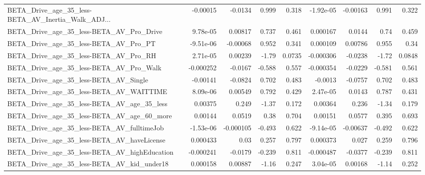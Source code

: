 \begin{tabular}{lrrrrrrrr}
BETA\_Drive\_age\_35\_less-BETA\_AV\_Inertia\_Walk\_ADJ... &    -0.00015 &      -0.0134 &    0.999 &    0.318 &  -1.92e-05 &    -0.00163 &        0.991 &         0.322 \\
BETA\_Drive\_age\_35\_less-BETA\_AV\_Pro\_Drive           &    9.78e-05 &      0.00817 &    0.737 &    0.461 &   0.000167 &      0.0144 &         0.74 &         0.459 \\
BETA\_Drive\_age\_35\_less-BETA\_AV\_Pro\_PT              &   -9.51e-06 &     -0.00068 &    0.952 &    0.341 &   0.000109 &     0.00786 &        0.955 &          0.34 \\
BETA\_Drive\_age\_35\_less-BETA\_AV\_Pro\_RH              &    2.71e-05 &      0.00239 &    -1.79 &   0.0735 &  -0.000306 &     -0.0238 &        -1.72 &        0.0848 \\
BETA\_Drive\_age\_35\_less-BETA\_AV\_Pro\_Walk            &   -0.000252 &      -0.0167 &   -0.588 &    0.557 &  -0.000354 &     -0.0229 &       -0.581 &         0.561 \\
BETA\_Drive\_age\_35\_less-BETA\_AV\_Single              &    -0.00141 &      -0.0824 &    0.702 &    0.483 &    -0.0013 &     -0.0757 &        0.702 &         0.483 \\
BETA\_Drive\_age\_35\_less-BETA\_AV\_WAITTIME            &    8.09e-06 &      0.00549 &    0.792 &    0.429 &   2.47e-05 &      0.0143 &        0.787 &         0.431 \\
BETA\_Drive\_age\_35\_less-BETA\_AV\_age\_35\_less         &     0.00375 &        0.249 &    -1.37 &    0.172 &    0.00364 &       0.236 &        -1.34 &         0.179 \\
BETA\_Drive\_age\_35\_less-BETA\_AV\_age\_60\_more         &     0.00144 &       0.0519 &     0.38 &    0.704 &    0.00151 &      0.0577 &        0.395 &         0.693 \\
BETA\_Drive\_age\_35\_less-BETA\_AV\_fulltimeJob         &   -1.53e-06 &    -0.000105 &   -0.493 &    0.622 &  -9.14e-05 &    -0.00637 &       -0.492 &         0.622 \\
BETA\_Drive\_age\_35\_less-BETA\_AV\_haveLicense         &    0.000433 &         0.03 &    0.257 &    0.797 &   0.000373 &       0.027 &        0.259 &         0.796 \\
BETA\_Drive\_age\_35\_less-BETA\_AV\_highEducation       &   -0.000241 &      -0.0179 &   -0.239 &    0.811 &  -0.000487 &     -0.0377 &       -0.239 &         0.811 \\
BETA\_Drive\_age\_35\_less-BETA\_AV\_kid\_under18         &    0.000158 &      0.00887 &    -1.16 &    0.247 &   3.04e-05 &     0.00168 &        -1.14 &         0.252 \\

\end{tabular}
